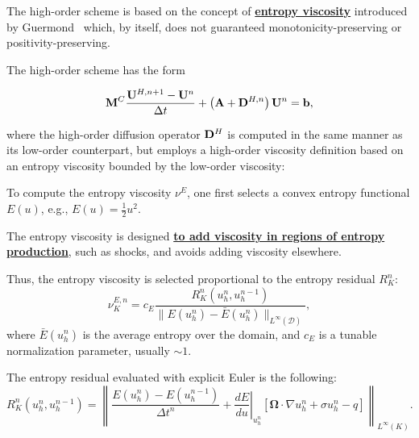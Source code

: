 The high-order scheme is based on the concept of \underline{\bf entropy
viscosity} introduced by Guermond~\cite{guermond_ev,guermond_secondorder} which, by itself,
does not guaranteed monotonicity-preserving or positivity-preserving.

The high-order scheme has the form

\begin{equation}\label{eq:highorderscheme}
   \mathbf{M}^C\frac{\mathbf{U}^{H,n+1}-\mathbf{U}^n}{\Delta t}
      +\left(\mathbf{A}+\textcolor{black}{\mathbf{D}^{H,n}}\right)\mathbf{U}^n = \mathbf{b},
\end{equation}

where the high-order diffusion operator $\textcolor{black}{\mathbf{D}^{H}}$ is computed in the same manner
as its low-order counterpart, but employs a high-order viscosity definition
based on an entropy viscosity bounded by the low-order viscosity:

To compute the entropy viscosity $\nu^{E}$, 
one first selects a convex entropy functional $E(u)$, e.g., $E(u)=\tfrac{1}{2}u^2$.

The entropy viscosity is designed \underline{\bf to add viscosity in regions of entropy
production}, such as shocks, and avoids adding viscosity elsewhere. 

Thus, the entropy viscosity is selected proportional to the entropy residual $R_K^n$:
\begin{equation}
\boxed{
   \nu^{E,n}_K = c_E \frac{R_K^n(u_h^n,u_h^{n-1})}      
      {\|E(u_h^n)-\bar{E}(u_h^n)\|_{L^\infty(\mathcal{D})}},
}
\end{equation}
where 
$\bar{E}(u_h^n)$ is the average
entropy over the domain, 
and $c_E$ is a tunable normalization parameter, 
usually $\sim 1$.

The entropy residual evaluated with explicit Euler is the following:
\begin{equation}
\boxed{
    R_K^n(u_h^n,u_h^{n-1}) = \left\|\frac{E(u_h^n)-E(u_h^{n-1})}{\Delta t^n}
      + \left.\frac{dE}{du}\right|_{u_h^n}\left[\mathbf{\Omega}\cdot\nabla u_h^n
      + \sigma u_h^n
      - q \right]\right\|_{L^\infty(K)}.
}
\end{equation}

